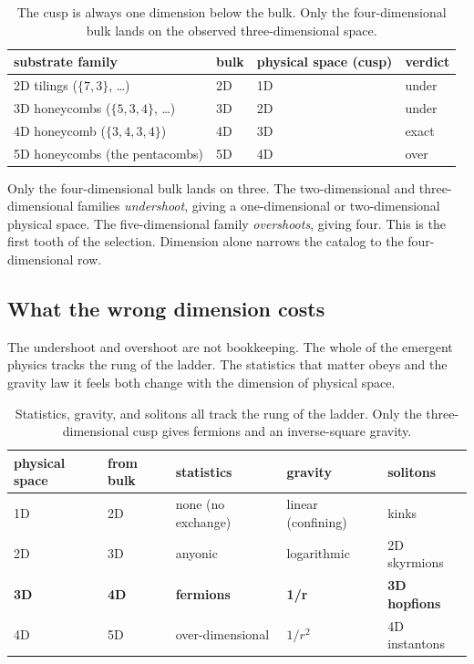 \begin{table}[ht]
\centering
\begin{tabular}{@{}llll@{}}
\toprule
substrate family & bulk & physical space (cusp) & verdict \\
\midrule
2D tilings ($\{7,3\}$, \ldots) & 2D & 1D & under \\
3D honeycombs ($\{5,3,4\}$, \ldots) & 3D & 2D & under \\
4D honeycomb ($\{3,4,3,4\}$) & 4D & 3D & exact \\
5D honeycombs (the pentacombs) & 5D & 4D & over \\
\bottomrule
\end{tabular}
\caption{The cusp is always one dimension below the bulk. Only the four-dimensional bulk lands on the observed three-dimensional space.}
\label{tab:dimension-ladder}
\end{table}

Only the four-dimensional bulk lands on three. The two-dimensional and three-dimensional families \emph{undershoot}, giving a one-dimensional or two-dimensional physical space. The five-dimensional family \emph{overshoots}, giving four. This is the first tooth of the selection. Dimension alone narrows the catalog to the four-dimensional row.

\subsection{What the wrong dimension costs}

The undershoot and overshoot are not bookkeeping. The whole of the emergent physics tracks the rung of the ladder. The statistics that matter obeys and the gravity law it feels both change with the dimension of physical space.

\begin{table}[ht]
\centering
\begin{tabular}{@{}lllll@{}}
\toprule
physical space & from bulk & statistics & gravity & solitons \\
\midrule
1D & 2D & none (no exchange) & linear (confining) & kinks \\
2D & 3D & anyonic & logarithmic & 2D skyrmions \\
\textbf{3D} & \textbf{4D} & \textbf{fermions} & \textbf{1/r} & \textbf{3D hopfions} \\
4D & 5D & over-dimensional & $1/r^2$ & 4D instantons \\
\bottomrule
\end{tabular}
\caption{Statistics, gravity, and solitons all track the rung of the ladder. Only the three-dimensional cusp gives fermions and an inverse-square gravity.}
\label{tab:dimension-cost}
\end{table}

